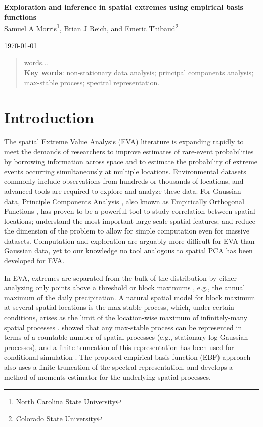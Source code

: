 \documentclass[11pt]{article}
\begin{document}
\linenumbers
\pagestyle{empty}
\begin{center}
{\Large {\bf Exploration and inference in spatial extremes using empirical basis functions}}\\

{\large Samuel A Morris\footnote[1]{North Carolina State University}, Brian J Reich\footnotemark[1]{}, and Emeric Thibaud\footnote[2]{Colorado State University}}

\today
\end{center}


\begin{abstract}
	words...\\
	{\bf Key words}: non-stationary data analysis; principal components analysis; max-stable process; spectral representation.

\end{abstract}
\newpage
\pagestyle{plain}
\setcounter{page}{1}

\section{Introduction}\label{ebs:intro}
The spatial Extreme Value Analysis (EVA) literature is expanding rapidly \citep{Davison2012} to meet the demands of researchers to improve estimates of rare-event probabilities by borrowing information across space and to estimate the probability of extreme events occurring simultaneously at multiple locations.
Environmental datasets commonly include observations from hundreds or thousands of locations, and advanced tools are required to explore and analyze these data.
For Gaussian data, Principle Components Analysis \citep[PCA]{Everitt2008}, also known as Empirically Orthogonal Functions \citep[EOF]{Toggweiler2001}, has proven to be a powerful tool to study correlation between spatial locations; understand the most important large-scale spatial features; and reduce the dimension of the problem to allow for simple computation even for massive datasets.
Computation and exploration are arguably more difficult for EVA than Gaussian data, yet to our knowledge no tool analogous to spatial PCA has been developed for EVA.

In EVA, extremes are separated from the bulk of the distribution by either analyzing only points above a threshold or block maximums \citep{Coles2001}, e.g., the annual maximum of the daily precipitation.
A natural spatial model for block maximum at several spatial locations is the max-stable process, which, under certain conditions, arises as the limit of the location-wise maximum of infinitely-many spatial processes \citep{deHaan2006}.
 showed that any max-stable process can be represented in terms of a countable number of spatial processes (e.g., stationary log Gaussian processes), and a finite truncation of this representation has been used for conditional simulation \citep{Wang2011}.
The proposed empirical basis function (EBF) approach also uses a finite truncation of the spectral representation, and develops a method-of-moments estimator for the underlying spatial processes.
\end{document}

